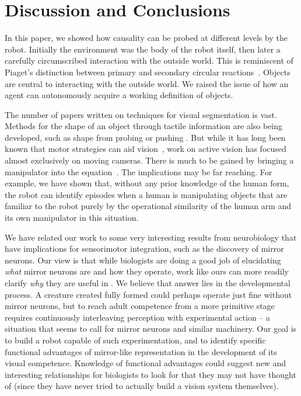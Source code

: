 
\section{Discussion and Conclusions}

In this paper, we showed how causality can be probed at different
levels by the robot.  Initially the environment was the body of the
robot itself, then later a carefully circumscribed interaction with
the outside world.  This is reminiscent of Piaget's distinction
between primary and secondary circular
reactions~\cite{ginsburg78piaget}.  Objects are central to interacting
with the outside world.  We raised the issue of how an agent can
autonomously acquire a working definition of objects. 

The number of papers written on techniques for visual segmentation is
vast.  Methods for \ahhcharacterizing{} the shape of an object through
tactile information are also being developed, such as shape from
probing 
\cite{paulos99fast} 
or pushing
\cite{moll01reconstructing}.  
But while it has long
been known that motor strategies can aid
vision~\cite{ballard91animate}, work on active vision has focused
almost exclusively on moving cameras.  There is much to be gained by
bringing a manipulator into the equation~\cite{tsikos91segmentation}.
The implications may be far reaching.  For example,
we have shown that, without any prior knowledge of the human form, 
the robot can identify episodes when a human is manipulating objects
that are familiar to the robot purely by the operational similarity 
of the human arm and its own manipulator in this situation.

We have related our work to some very interesting results from
neurobiology that have implications for sensorimotor integration, such
as the discovery of mirror neurons.  Our view is that while biologists
are doing a good job of elucidating {\em what} mirror neurons are and
how they operate, work like ours can more readily clarify {\em why}
they are useful in \ahhpractice{}.  We believe that answer lies in the
developmental process.  A creature created fully formed could perhaps
operate just fine without mirror neurons, but to reach adult
competence from a more primitive stage requires continuously
interleaving perception with experimental action -- a situation that
seems to call for mirror neurons and similar machinery.  Our goal is
to build a robot capable of such experimentation, and to identify
specific functional advantages of mirror-like representation in the
development of its visual competence.  Knowledge of functional
advantages could suggest new and interesting relationships for biologists to
look for that they may not have thought of (since they have never
tried to actually build a vision system themselves).


